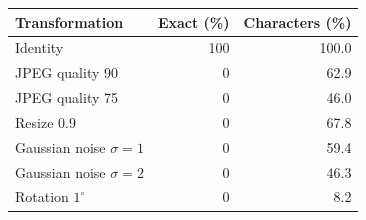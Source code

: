 \begin{tabular}{lrr}
\toprule
\textbf{Transformation} & \textbf{Exact (\%)} & \textbf{Characters (\%)} \\
\midrule
Identity & 100 & 100.0 \\
JPEG quality 90 & 0 & 62.9 \\
JPEG quality 75 & 0 & 46.0 \\
Resize 0.9 & 0 & 67.8 \\
Gaussian noise $\sigma=1$ & 0 & 59.4 \\
Gaussian noise $\sigma=2$ & 0 & 46.3 \\
Rotation $1^\circ$ & 0 & 8.2 \\
\bottomrule
\end{tabular}
